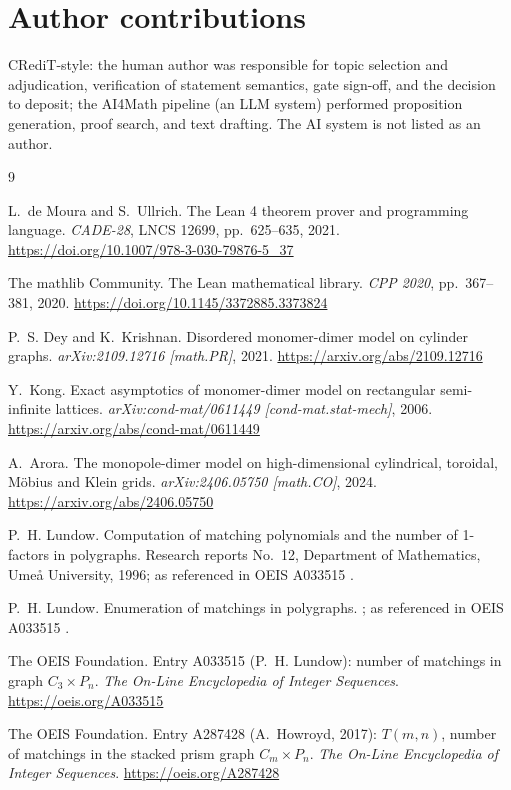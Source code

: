 \documentclass[11pt]{article}
\begin{document}
\section*{Author contributions}

CRediT-style: the human author was responsible for topic selection and
adjudication, verification of statement semantics, gate sign-off, and the
decision to deposit; the AI4Math pipeline (an LLM system) performed
proposition generation, proof search, and text drafting. The AI system is
not listed as an author.

\begin{thebibliography}{9}

L.~de Moura and S.~Ullrich.
\newblock The Lean 4 theorem prover and programming language.
\newblock \emph{CADE-28}, LNCS 12699, pp.~625--635, 2021.
\url{https://doi.org/10.1007/978-3-030-79876-5_37}

The mathlib Community.
\newblock The Lean mathematical library.
\newblock \emph{CPP 2020}, pp.~367--381, 2020.
\url{https://doi.org/10.1145/3372885.3373824}

P.~S. Dey and K.~Krishnan.
\newblock Disordered monomer-dimer model on cylinder graphs.
\newblock \emph{arXiv:2109.12716 [math.PR]}, 2021.
\url{https://arxiv.org/abs/2109.12716}

Y.~Kong.
\newblock Exact asymptotics of monomer-dimer model on rectangular
semi-infinite lattices.
\newblock \emph{arXiv:cond-mat/0611449 [cond-mat.stat-mech]}, 2006.
\url{https://arxiv.org/abs/cond-mat/0611449}

A.~Arora.
\newblock The monopole-dimer model on high-dimensional cylindrical, toroidal,
M\"obius and Klein grids.
\newblock \emph{arXiv:2406.05750 [math.CO]}, 2024.
\url{https://arxiv.org/abs/2406.05750}

P.~H. Lundow.
\newblock Computation of matching polynomials and the number of 1-factors in
polygraphs.
\newblock Research reports No.~12, Department of Mathematics, Ume{\aa}
University, 1996; as referenced in OEIS A033515 \cite{oeis-a033515}.

P.~H. Lundow.
\newblock Enumeration of matchings in polygraphs.
; as referenced in OEIS A033515 \cite{oeis-a033515}.

The OEIS Foundation.
\newblock Entry A033515 (P.~H. Lundow): number of matchings in graph
$C_3 \times P_n$.
\newblock \emph{The On-Line Encyclopedia of Integer Sequences}.
\url{https://oeis.org/A033515}

The OEIS Foundation.
\newblock Entry A287428 (A.~Howroyd, 2017): $T(m,n)$, number of matchings in
the stacked prism graph $C_m \times P_n$.
\newblock \emph{The On-Line Encyclopedia of Integer Sequences}.
\url{https://oeis.org/A287428}

\end{thebibliography}
\end{document}

